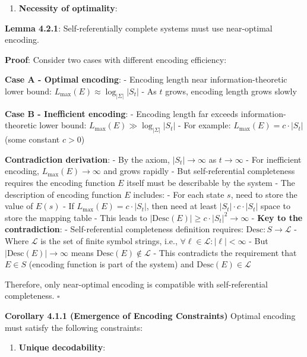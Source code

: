 \begin{enumerate}
\item \textbf{Necessity of optimality}:
\end{enumerate}
   
   \textbf{Lemma 4.2.1}: Self-referentially complete systems must use near-optimal encoding.
\label{lemma:2.4.1}
   
   \textbf{Proof}:
   Consider two cases with different encoding efficiency:
   
   \textbf{Case A - Optimal encoding}:
   - Encoding length near information-theoretic lower bound: $L_{\max}(E) \approx \log_{|\Sigma|} |S_t|$
   - As $t$ grows, encoding length grows slowly
   
   \textbf{Case B - Inefficient encoding}:
   - Encoding length far exceeds information-theoretic lower bound: $L_{\max}(E) \gg \log_{|\Sigma|} |S_t|$
   - For example: $L_{\max}(E) = c \cdot |S_t|$ (some constant $c > 0$)
   
   \textbf{Contradiction derivation}:
   - By the axiom, $|S_t| \to \infty$ as $t \to \infty$
   - For inefficient encoding, $L_{\max}(E) \to \infty$ and grows rapidly
   - But self-referential completeness requires the encoding function $E$ itself must be describable by the system
   - The description of encoding function $E$ includes:
     - For each state $s$, need to store the value of $E(s)$
     - If $L_{\max}(E) = c \cdot |S_t|$, then need at least $|S_t| \cdot c \cdot |S_t|$ space to store the mapping table
     - This leads to $|\text{Desc}(E)| \geq c \cdot |S_t|^2 \to \infty$
   - \textbf{Key to the contradiction}:
     - Self-referential completeness definition requires: $\text{Desc}: S \to \mathcal{L}$
     - Where $\mathcal{L}$ is the set of finite symbol strings, i.e., $\forall \ell \in \mathcal{L}: |\ell| < \infty$
     - But $|\text{Desc}(E)| \to \infty$ means $\text{Desc}(E) \notin \mathcal{L}$
     - This contradicts the requirement that $E \in S$ (encoding function is part of the system) and $\text{Desc}(E) \in \mathcal{L}$
   
   Therefore, only near-optimal encoding is compatible with self-referential completeness. $\square$

\textbf{Corollary 4.1.1 (Emergence of Encoding Constraints)}
\label{corollary:2.4.1}
Optimal encoding must satisfy the following constraints:

\begin{enumerate}
\item \textbf{Unique decodability}:
\end{enumerate}
   
